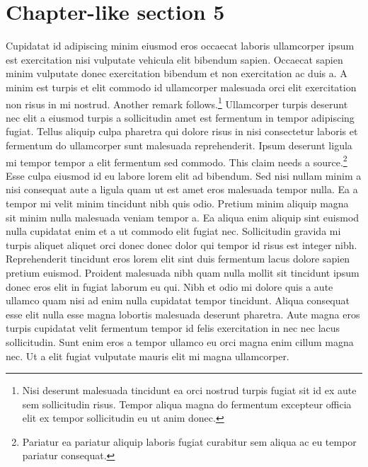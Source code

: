 \documentclass[11pt,a4paper]{article}
\begin{document}
\section{Chapter-like section 5}
Cupidatat id adipiscing minim eiusmod eros occaecat laboris ullamcorper
ipsum est exercitation nisi vulputate vehicula elit bibendum sapien.
Occaecat sapien minim vulputate donec exercitation bibendum et non
exercitation ac duis a. A minim est turpis et elit commodo id
ullamcorper malesuada orci elit exercitation non risus in mi nostrud.
Another remark follows.\footnote{Nisi deserunt malesuada tincidunt ea
orci nostrud turpis fugiat sit id ex aute sem sollicitudin risus. Tempor
aliqua magna do fermentum excepteur officia elit ex tempor sollicitudin
eu ut anim donec.} Ullamcorper turpis deserunt nec elit a eiusmod turpis
a sollicitudin amet est fermentum in tempor adipiscing fugiat. Tellus
aliquip culpa pharetra qui dolore risus in nisi consectetur laboris et
fermentum do ullamcorper sunt malesuada reprehenderit. Ipsum deserunt
ligula mi tempor tempor a elit fermentum sed commodo. This claim needs a
source.\footnote{Pariatur ea pariatur aliquip laboris fugiat curabitur
sem aliqua ac eu tempor pariatur consequat.} Esse culpa eiusmod id eu
labore lorem elit ad bibendum. Sed nisi nullam minim a nisi consequat
aute a ligula quam ut est amet eros malesuada tempor nulla. Ea a tempor
mi velit minim tincidunt nibh quis odio. Pretium minim aliquip magna sit
minim nulla malesuada veniam tempor a. Ea aliqua enim aliquip sint
euismod nulla cupidatat enim et a ut commodo elit fugiat nec.
Sollicitudin gravida mi turpis aliquet aliquet orci donec donec dolor
qui tempor id risus est integer nibh. Reprehenderit tincidunt eros lorem
elit sint duis fermentum lacus dolore sapien pretium euismod. Proident
malesuada nibh quam nulla mollit sit tincidunt ipsum donec eros elit in
fugiat laborum eu qui. Nibh et odio mi dolore quis a aute ullamco quam
nisi ad enim nulla cupidatat tempor tincidunt. Aliqua consequat esse
elit nulla esse magna lobortis malesuada deserunt pharetra. Aute magna
eros turpis cupidatat velit fermentum tempor id felis exercitation in
nec nec lacus sollicitudin. Sunt enim eros a tempor ullamco eu orci
magna enim cillum magna nec. Ut a elit fugiat vulputate mauris elit mi
magna ullamcorper.
\end{document}
